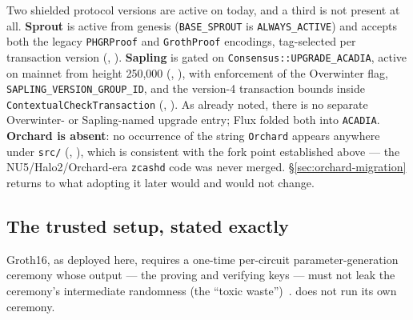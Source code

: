 Two shielded protocol versions are active on \fluxd today, and a third is not present at all.
\textbf{Sprout} is active from genesis (\texttt{BASE\_SPROUT} is \texttt{ALWAYS\_ACTIVE}) and accepts
both the legacy \texttt{PHGRProof} and \texttt{GrothProof} encodings, tag-selected per transaction
version (\shipped, ). \textbf{Sapling} is gated on
\texttt{Consensus::\allowbreak{}UPGRADE\_ACADIA}, active on mainnet from height 250{,}000 (\shipped,
), with enforcement of the Overwinter flag,
\texttt{SAPLING\_VERSION\_GROUP\_ID}, and the version-4 transaction bounds inside
\texttt{Contextual\allowbreak{}Check\allowbreak{}Transaction} (\shipped, ). As already
noted, there is no separate Overwinter- or Sapling-named upgrade entry; Flux folded both into
\texttt{ACADIA}. \textbf{Orchard is absent}: no occurrence of the string \texttt{Orchard} appears
anywhere under \texttt{src/} (\shipped, ), which is
consistent with the fork point established above — the NU5/Halo2/Orchard-era \texttt{zcashd} code was
never merged. \S\ref{sec:orchard-migration} returns to what adopting it later would and would not
change.

\subsection{The trusted setup, stated exactly}
\label{sec:trusted-setup}

Groth16, as deployed here, requires a one-time per-circuit parameter-generation ceremony whose
output — the proving and verifying keys — must not leak the ceremony's intermediate randomness (the
``toxic waste'')~\citep{groth2016size,bensasson2014zerocash}. \fluxd does not run its own ceremony.

